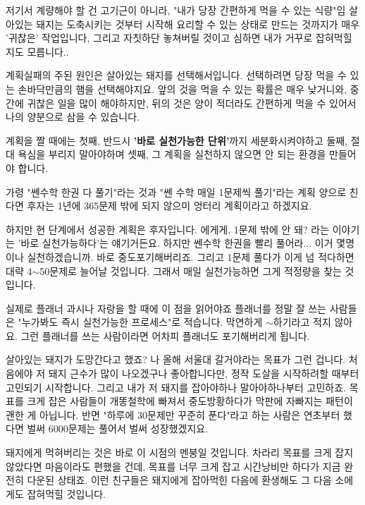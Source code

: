 저기서 계량해야 할 건 고기근이 아니라, "내가 당장 간편하게 먹을 수 있는 식량"임
살아있는 돼지는 도축시키는 것부터 시작해 요리할 수 있는 상태로 만드는 것까지가 매우 '귀찮은' 작업입니다,
그리고 자칫하단 놓쳐버릴 것이고
심하면 내가 거꾸로 잡혀먹힐지도 모릅니다..
\vspace{5mm}

계획실패의 주된 원인은 살아있는 돼지를 선택해서입니다.
선택하려면 당장 먹을 수 있는 손바닥만큼의 햄을 선택해야지요.
앞의 것을 먹을 수 있는 확률은 매우 낮거니와, 중간에 귀찮은 일을 많이 해야하지만,
뒤의 것은 양이 적더라도 간편하게 먹을 수 있어서 나의 양분으로 삼을 수 있습니다.
\vspace{5mm}

계획을 짤 때에는
첫째, 반드시 \textbf{'바로 실천가능한 단위'}까지 세분화시켜야하고
둘째, 절대 욕심을 부리지 말아야하며
셋째, 그 계획을 실천하지 않으면 안 되는 환경을 만들어야 합니다.
\vspace{5mm}

가령 "쎈수학 한권 다 풀기"라는 것과 "쎈 수학 매일 1문제씩 풀기"라는 계획
양으로 친다면 후자는 1년에 365문제 밖에 되지 않으미 엉터리 계획이라고 하겠지요.
\vspace{5mm}

하지만 현 단계에서 성공한 계획은 후자입니다. 에게게, 1문제 밖에 안 돼? 라는 이야기는 '바로 실천가능하다'는 얘기거든요.
하지만 쎈수학 한권을 빨리 풀어라... 이거 몇명이나 실천하겠습니까. 바로 중도포기해버리죠.
그리고 1문제 풀다가 이게 넘 적다하면 대략 4$\sim$50문제로 늘어날 것입니다. 그래서 매일 실천가능하면 그게 적정량을 찾는 것입니다.
\vspace{5mm}

실제로 플래너 과시나 자랑을 할 때에 이 점을 읽어야죠
플래너를 정말 잘 쓰는 사람들은 "누가봐도 즉시 실천가능한 프로세스"로 적습니다.
막연하게 $\sim$하기라고 적지 않아요. 그런 플래너를 쓰는 사람이라면 어차피 플래너도 포기해버리게 됩니다.
\vspace{5mm}

살아있는 돼지가 도망간다고 했죠?
나 올해 서울대 갈거야라는 목표가 그런 겁니다. 처음에야 저 돼지 근수가 많이 나오겠구나 좋아합니다만,
정작 도살을 시작하려할 때부터 고민되기 시작합니다. 그리고 내가 저 돼지를 잡아야하나 말아야하나부터 고민하죠.
목표를 크게 잡은 사람들이 개똥철학에 빠져서 중도방황하다가 막판에 자빠지는 패턴이 괜한 게 아닙니다.
반면 "하루에 30문제만 꾸준히 푼다"라고 하는 사람은 연초부터 했다면 벌써 6000문제는 풀어서 벌써 성장했겠지요.
\vspace{5mm}

돼지에게 먹혀버리는 것은 바로 이 시점의 멘붕일 것입니다.
차라리 목표를 크게 잡지 않았다면 마음이라도 편했을 건데, 목표를 너무 크게 잡고 시간낭비만 하다가 지금 완전히 다운된 상태죠.
이런 친구들은 돼지에게 잡아먹힌 다음에 환생해도 그 다음 소에게도 잡혀먹힐 것입니다.
\vspace{5mm}

